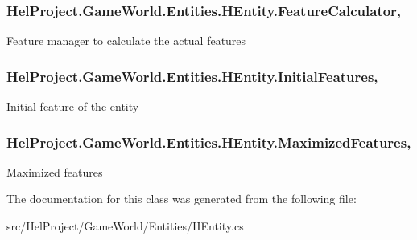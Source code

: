 \subsubsection[{Feature\+Calculator}]{ Hel\+Project.\+Game\+World.\+Entities.\+H\+Entity.\+Feature\+Calculator\hspace{0.3cm}{\ttfamily [get]}, {\ttfamily [set]}}\label{class_hel_project_1_1_game_world_1_1_entities_1_1_h_entity_a80aaee359bc963011a0f34c1f27aa47c}


Feature manager to calculate the actual features 

\hypertarget{class_hel_project_1_1_game_world_1_1_entities_1_1_h_entity_a155d3d12d931e900e26d770c120ec361}{}
\subsubsection[{Initial\+Features}]{ Hel\+Project.\+Game\+World.\+Entities.\+H\+Entity.\+Initial\+Features\hspace{0.3cm}{\ttfamily [get]}, {\ttfamily [set]}}\label{class_hel_project_1_1_game_world_1_1_entities_1_1_h_entity_a155d3d12d931e900e26d770c120ec361}


Initial feature of the entity 

\hypertarget{class_hel_project_1_1_game_world_1_1_entities_1_1_h_entity_afb7fd74a8073bf8311bceba415e6022c}{}
\subsubsection[{Maximized\+Features}]{ Hel\+Project.\+Game\+World.\+Entities.\+H\+Entity.\+Maximized\+Features\hspace{0.3cm}{\ttfamily [get]}, {\ttfamily [set]}}\label{class_hel_project_1_1_game_world_1_1_entities_1_1_h_entity_afb7fd74a8073bf8311bceba415e6022c}


Maximized features 



The documentation for this class was generated from the following file\+:\begin{DoxyCompactItemize}
\item 
src/\+Hel\+Project/\+Game\+World/\+Entities/H\+Entity.\+cs\end{DoxyCompactItemize}
